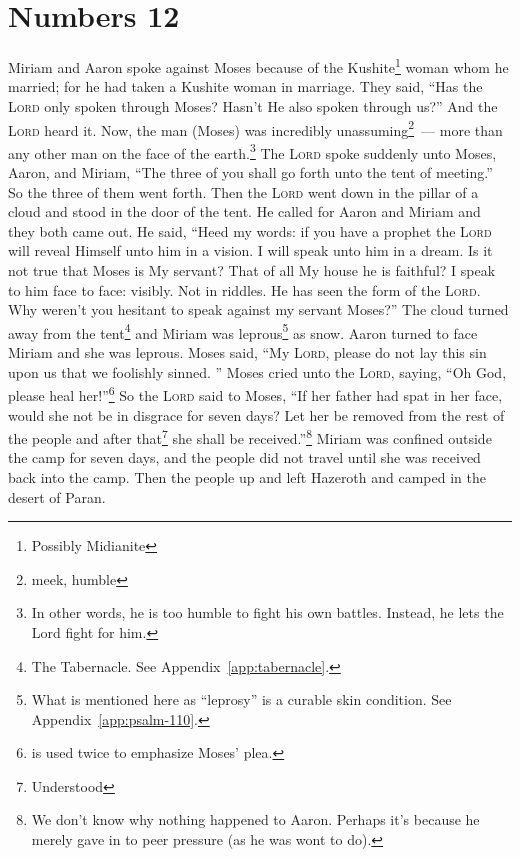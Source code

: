 \section{Numbers 12}\label{Numbers 12}
\begin{enumerate}[align=center]
     Miriam and Aaron spoke against Moses because of the Kushite\footnote{Possibly Midianite} woman whom he married; for he had taken a Kushite woman in marriage.%
     They said, ``Has the \textsc{Lord} only spoken through Moses? Hasn't He also spoken through us?'' And the \textsc{Lord} heard it.%
     Now, the man (Moses) was incredibly unassuming\footnote{meek, humble}~--- more than any other man on the face of the earth.\footnote{In other words, he is too humble to fight his own battles. Instead, he lets the Lord fight for him.}%
     The \textsc{Lord} spoke suddenly unto Moses, Aaron, and Miriam, ``The three of you shall go forth unto the tent of meeting.'' So the three of them went forth.%
     Then the \textsc{Lord} went down in the pillar of a cloud and stood in the door of the tent. He called for Aaron and Miriam and they both came out.%
     He said, ``Heed my words: if you have a prophet the \textsc{Lord} will reveal Himself unto him in a vision. I will speak unto him in a dream.%
     Is it not true that Moses is My servant? That of all My house he is faithful?%
     I speak to him face to face: visibly. Not in riddles. He has seen the form of the \textsc{Lord}. Why weren't you hesitant to speak against my servant Moses?''%
     The cloud turned away from the tent\footnote{The Tabernacle. See Appendix~\ref{app:tabernacle}.} and Miriam was leprous\footnote{What is mentioned here as ``leprosy'' is a curable skin condition. See Appendix~\ref{app:psalm-110}.} as snow. Aaron turned to face Miriam and she was leprous.
     Moses said, ``My \textsc{Lord}, please do not lay this sin upon us that we foolishly sinned.%
     ''%
     Moses cried unto the \textsc{Lord}, saying, ``Oh God, please heal her!''\footnote{ is used twice to emphasize Moses' plea.}%
     So the \textsc{Lord} said to Moses, ``If her father had spat in her face, would she not be in disgrace for seven days? Let her be removed from the rest of the people and after that\footnote{Understood} she shall be received.''\footnote{We don't know why nothing happened to Aaron. Perhaps it's because he merely gave in to peer pressure (as he was wont to do).}%
     Miriam was confined outside the camp for seven days, and the people did not travel until she was received back into the camp.%
     Then the people up and left Hazeroth and camped in the desert of Paran.%
\end{enumerate}
